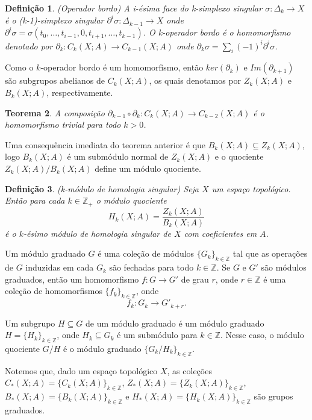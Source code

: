 \documentclass[12pt]{book}
\newtheorem{teorema}{Teorema}[section]
\newtheorem{definicao}[teorema]{Definição}
\newcommand{\bordo}[1]{\partial_{#1}}
\newcommand{\cadeia}[2]{C_{#1}(#2; A)}
\newcommand{\colecao}[1]{\{#1_{k} \}_{k\in \inteiros}}
\newcommand{\colecaoabrev}[1]{\{#1 \}_{k\in \inteiros}}
\newcommand{\homologia}[2]{H_{#1}(#2;A)}
\newcommand{\imagembordo}[2]{B_{#1}(#2;A)}
\newcommand{\inteiros}{\mathbb{Z}}
\newcommand{\inteirospos}{\inteiros_{+}}
\newcommand{\kernelbordo}[2]{Z_{#1}(#2;A)}
\begin{document}
	\begin{definicao}
		(Operador bordo) A i-ésima face do k-simplexo singular $\sigma: \Delta_{k} \to X$ é o (k-1)-simplexo singular $\partial^{i}\sigma:\Delta_{k-1} \to X$ onde $\partial^{i}\sigma = \sigma(t_{0}, \dots, t_{i-1},0,t_{i+1}, \dots, t_{k-1})$. O k-operador bordo é o homomorfismo denotado por $\bordo{k}: \cadeia{k}{X} \to \cadeia{k-1}{X}$ onde $\bordo{k}\sigma = \sum_{i} (-1)^{i}\partial^{i}\sigma$.
	\end{definicao}
	
	Como o $k$-operador bordo é um homomorfismo, então $ker(\bordo{k})$ e $Im(\bordo{k+1})$ são subgrupos abelianos de $\cadeia{k}{X}$, os quais denotamos por $\kernelbordo{k}{X}$ e $\imagembordo{k}{X}$, respectivamente.
	
	\begin{teorema}
		A composição $\bordo{k-1}\circ\bordo{k}: \cadeia{k}{X} \to \cadeia{k-2}{X}$ é o homomorfismo trivial para todo $k>0$.
	\end{teorema}
	
	Uma consequência imediata do teorema anterior é que $\imagembordo{k}{X} \subseteq \kernelbordo{k}{X}$, logo $\imagembordo{k}{X}$ é um submódulo normal de $\kernelbordo{k}{X}$ e o quociente $\kernelbordo{k}{X}/\imagembordo{k}{X}$ define um módulo quociente.
	
	\begin{definicao}
		(k-módulo de homologia singular) Seja $X$ um espaço topológico. Então para cada $k \in \inteirospos$ o módulo quociente
		$$
		\homologia{k}{X} = \frac{\kernelbordo{k}{X}}{\imagembordo{k}{X}}
		$$
		é o $k$-ésimo módulo de homologia singular de $X$ com coeficientes em $A$.
	\end{definicao}
	
	Um módulo graduado $G$ é uma coleção de módulos $\colecao{G}$ tal que as operações de $G$ induzidas em cada $G_{k}$ são fechadas para todo $k \in \inteiros$. Se $G$ e $G'$ são módulos graduados, então um homomorfismo $f:G\to G'$ de grau $r$, onde $r \in \inteiros$ é uma coleção de homomorfismos $\colecao{f}$, onde 
	$$
	f_{k}:G_{k}\to G'_{k+r}.
	$$
	
	Um subgrupo $H\subseteq G$ de um módulo graduado é um módulo graduado $H=\colecao{H}$, onde $H_{k} \subseteq G_{k}$ é um submódulo para $k \in \inteiros$. Nesse caso, o módulo quociente $G/H$ é o módulo graduado $\{G_{k}/H_{k} \}_{k\in \inteiros}$.
	
	Notemos que, dado um espaço topológico $X$, as coleções $\cadeia{*}{X} = \colecaoabrev{\cadeia{k}{X}}$, $\kernelbordo{*}{X}=\colecaoabrev{\kernelbordo{k}{X}}$, $\imagembordo{*}{X}=\colecaoabrev{\imagembordo{k}{X}}$ e $\homologia{*}{X}=\colecaoabrev{\homologia{k}{X}}$ são grupos graduados.
	
\end{document}
